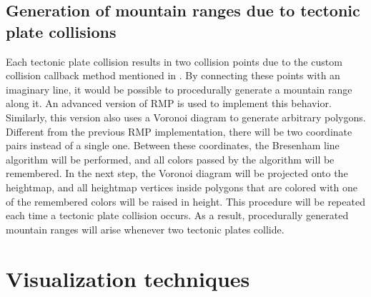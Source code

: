 \documentclass[11pt,a4paper,twoside,openright]{report}
\begin{document}
\subsection{Generation of mountain ranges due to tectonic plate collisions}
\label{subsec:generationofmountainranges}
Each tectonic plate collision results in two collision points due to the custom collision callback method mentioned in . By connecting these points with an imaginary line, it would be possible to procedurally generate a mountain range along it. An advanced version of RMP is used to implement this behavior. Similarly, this version also uses a Voronoi diagram to generate arbitrary polygons. Different from the previous RMP implementation, there will be two coordinate pairs instead of a single one. Between these coordinates, the Bresenham line algorithm will be performed, and all colors passed by the algorithm will be remembered. In the next step, the Voronoi diagram will be projected onto the heightmap, and all heightmap vertices inside polygons that are colored with one of the remembered colors will be raised in height. This procedure will be repeated each time a tectonic plate collision occurs. As a result, procedurally generated mountain ranges will arise whenever two tectonic plates collide.

\section{Visualization techniques}
\end{document}
